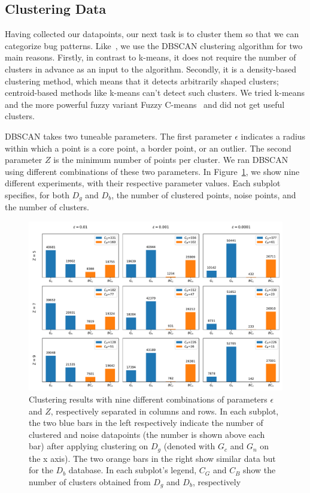 \subsection{\label{sec:clustering_data}Clustering Data}

Having collected our datapoints, our next task is to cluster them so that we can categorize bug patterns. Like~\cite{hanam2016discovering}, we use the DBSCAN clustering algorithm for two main reasons. Firstly, in contrast to k-means, it does not require the number of clusters in advance as an input to the algorithm. Secondly, it is a density-based clustering method, which means that it detects arbitrarily shaped clusters; centroid-based methods like k-means can't detect such clusters. We tried k-means and the more powerful fuzzy variant Fuzzy C-means~\cite{dunn1973fuzzy} and did not get useful clusters.

DBSCAN takes two tuneable parameters. The first parameter $\epsilon$ indicates a radius within which a point is a core point, a border point, or an outlier. The second parameter $Z$ is the minimum number of points per cluster. We ran DBSCAN using different combinations of these two parameters. In Figure~\ref{fig:clustering}, we show nine different experiments, with their respective parameter values. Each subplot specifies, for both $D_g$ and $D_b$, the number of clustered points, noise points, and the number of clusters.

\begin{figure}[h]
\centering
\includegraphics[width=1\textwidth]{figs/clusters.pdf}
\caption{\label{fig:clustering} Clustering results with nine different combinations of parameters $\epsilon$ and $Z$, respectively separated in columns and rows. In each subplot, the two blue bars in the left respectively indicate the number of clustered and noise datapoints (the number is shown above each bar) after applying clustering on $D_g$ (denoted with $G_c$ and $G_n$ on the x axis). The two orange bars in the right show similar data but for the $D_{b}$ database. In each subplot's legend, $C_G$ and $C_B$ show the number of clusters obtained from $D_g$ and $D_b$, respectively}
\end{figure}

